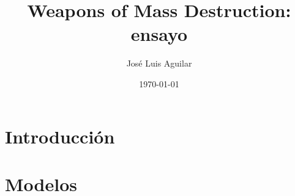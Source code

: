 \documentclass{article}
\title{Weapons of Mass Destruction: ensayo}
\author{José Luis Aguilar}
\date{\today}
\begin{document}
    \maketitle
    \begin{abstract}
        
    \end{abstract}
    \section{Introducción}
    \section{Modelos}
    \section{}
\end{document}
